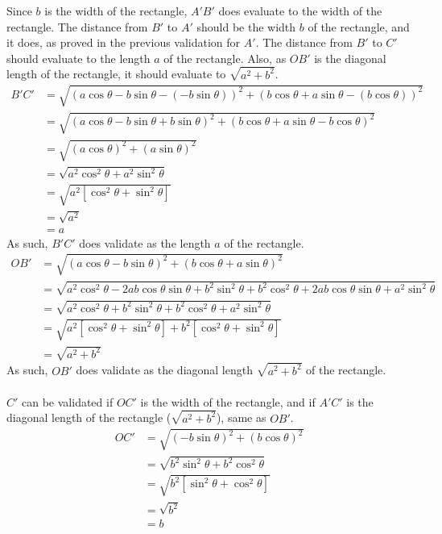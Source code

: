 \documentclass{article}
\begin{document}
        Since $b$ is the width of the rectangle, $A'B'$ does evaluate to the width of the rectangle.
        The distance from $B'$ to $A'$ should be the width $b$ of the rectangle, and it does, as proved in the previous validation for $A'$. The distance from $B'$ to $C'$ should evaluate to the length $a$ of the rectangle. Also, as $OB'$ is the diagonal length of the rectangle, it should evaluate to $\sqrt{a^2 + b^2}$.
        \begin{align*}
        	B'C' &= \sqrt{(a\cos{\theta} -b\sin{\theta} - (-b\sin{\theta}))^2 + (b\cos{\theta} + a\sin{\theta} - (b\cos{\theta}))^2} \\
        	&= \sqrt{(a\cos{\theta} -b\sin{\theta} + b\sin{\theta})^2 + (b\cos{\theta} + a\sin{\theta} - b\cos{\theta})^2} \\
        	&= \sqrt{(a\cos{\theta})^2 + (a\sin{\theta})^2} \\
        	&= \sqrt{a^2\cos^2{\theta} + a^2\sin^2{\theta}} \\
        	&= \sqrt{a^2[\cos^2{\theta} + \sin^2{\theta}]} \\
        	&= \sqrt{a^2} \\
        	&= a
        \end{align*}
        As such, $B'C'$ does validate as the length $a$ of the rectangle.
        \begin{align*}
        	OB' &= \sqrt{(a\cos{\theta} -b\sin{\theta})^2 + (b\cos{\theta} + a\sin{\theta})^2} \\
        	&= \sqrt{a^2\cos^2{\theta} - 2ab\cos\theta\sin\theta + b^2\sin^2{\theta} + b^2\cos^2{\theta} + 2ab\cos\theta\sin\theta + a^2\sin^2{\theta}} \\
        	&= \sqrt{a^2\cos^2{\theta} + b^2\sin^2{\theta} + b^2\cos^2{\theta} + a^2\sin^2{\theta}} \\
        	&= \sqrt{a^2[\cos^2{\theta} + \sin^2{\theta}] + b^2[\cos^2{\theta} + \sin^2{\theta}]} \\
        	&= \sqrt{a^2 + b^2}
        \end{align*}
        As such, $OB'$ does validate as the diagonal length $\sqrt{a^2 + b^2}$ of the rectangle.
        \\\\
        $C'$ can be validated if $OC'$ is the width of the rectangle, and if $A'C'$ is the diagonal length of the rectangle ($\sqrt{a^2 + b^2}$), same as $OB'$.
        \begin{align*}
        	OC' &= \sqrt{(-b\sin{\theta})^2 + (b\cos{\theta})^2} \\
        	&= \sqrt{b^2\sin^2{\theta} + b^2\cos^2{\theta}} \\
        	&= \sqrt{b^2[\sin^2{\theta} + \cos^2{\theta}]} \\
        	&= \sqrt{b^2} \\
        	&= b
        \end{align*}
\end{document}
